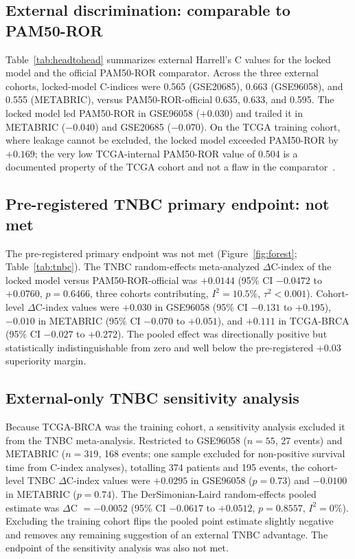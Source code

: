 \documentclass[11pt,letterpaper]{article}
\begin{document}
\subsection*{External discrimination: comparable to PAM50-ROR}

Table~\ref{tab:headtohead} summarizes external Harrell's C values for the locked model and the official PAM50-ROR comparator. Across the three external cohorts, locked-model C-indices were 0.565 (GSE20685), 0.663 (GSE96058), and 0.555 (METABRIC), versus PAM50-ROR-official 0.635, 0.633, and 0.595. The locked model led PAM50-ROR in GSE96058 ($+0.030$) and trailed it in METABRIC ($-0.040$) and GSE20685 ($-0.070$). On the TCGA training cohort, where leakage cannot be excluded, the locked model exceeded PAM50-ROR by $+0.169$; the very low TCGA-internal PAM50-ROR value of 0.504 is a documented property of the TCGA cohort and not a flaw in the comparator~\cite{gendoo2016genefu}.

\subsection*{Pre-registered TNBC primary endpoint: not met}

The pre-registered primary endpoint was not met (Figure~\ref{fig:forest}; Table~\ref{tab:tnbc}). The TNBC random-effects meta-analyzed $\Delta$C-index of the locked model versus PAM50-ROR-official was $+0.0144$ (95\% CI $-0.0472$ to $+0.0760$, $p = 0.6466$, three cohorts contributing, $I^2 = 10.5\%$, $\tau^2 < 0.001$). Cohort-level $\Delta$C-index values were $+0.030$ in GSE96058 (95\% CI $-0.131$ to $+0.195$), $-0.010$ in METABRIC (95\% CI $-0.070$ to $+0.051$), and $+0.111$ in TCGA-BRCA (95\% CI $-0.027$ to $+0.272$). The pooled effect was directionally positive but statistically indistinguishable from zero and well below the pre-registered $+0.03$ superiority margin.

\subsection*{External-only TNBC sensitivity analysis}

Because TCGA-BRCA was the training cohort, a sensitivity analysis excluded it from the TNBC meta-analysis. Restricted to GSE96058 ($n = 55$, 27 events) and METABRIC ($n = 319$, 168 events; one sample excluded for non-positive survival time from C-index analyses), totalling 374 patients and 195 events, the cohort-level TNBC $\Delta$C-index values were $+0.0295$ in GSE96058 ($p = 0.73$) and $-0.0100$ in METABRIC ($p = 0.74$). The DerSimonian-Laird random-effects pooled estimate was $\Delta$C $= -0.0052$ (95\% CI $-0.0617$ to $+0.0512$, $p = 0.8557$, $I^2 = 0\%$). Excluding the training cohort flips the pooled point estimate slightly negative and removes any remaining suggestion of an external TNBC advantage. The endpoint of the sensitivity analysis was also not met.
\end{document}
